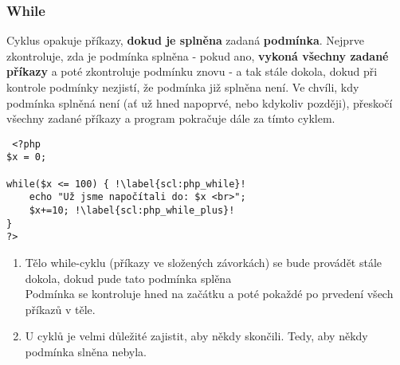\subsubsection{While}
Cyklus  opakuje příkazy, \textbf{dokud je splněna} zadaná \textbf{podmínka}. Nejprve zkontroluje, zda je podmínka splněna - pokud ano, \textbf{vykoná všechny zadané příkazy} a poté zkontroluje podmínku znovu - a tak stále dokola, dokud při kontrole podmínky nezjistí, že podmínka již splněna není. Ve chvíli, kdy podmínka splněná není (ať už hned napoprvé, nebo kdykoliv později), přeskočí všechny zadané příkazy a program pokračuje dále za tímto  cyklem.\\
\begin{minipage}[t]{.45\textwidth}
\begin{code}
\begin{verbatim}
 <?php
$x = 0;
 
while($x <= 100) { !\label{scl:php_while}!
    echo "Už jsme napočítali do: $x <br>";
    $x+=10; !\label{scl:php_while_plus}!
}
?> 
\end{verbatim}

\label{code:php_while}
\end{code}
\end{minipage}
\begin{minipage}[t]{.45\textwidth}
\begin{enumerate}
\item[ř. \ref{scl:php_while}:] Tělo while-cyklu (příkazy ve složených závorkách) se bude provádět stále dokola, dokud pude tato podmínka splěna\\
Podmínka se kontroluje hned na začátku a poté pokaždé po prvedení všech příkazů v těle.
\item[ř. \ref{scl:php_while_plus}:] U cyklů je velmi důležité zajistit, aby někdy skončili. Tedy, aby někdy podmínka slněna nebyla.
\end{enumerate}
\end{minipage}\\

